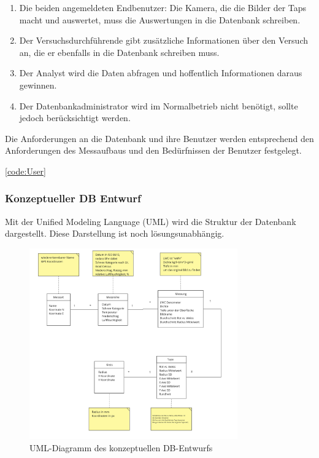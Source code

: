\begin{enumerate}
\item Die beiden angemeldeten Endbenutzer: Die Kamera, die die Bilder der Taps macht und auswertet, muss die Auswertungen in die Datenbank schreiben.
  \item Der Versuchsdurchführende gibt zusätzliche Informationen über den Versuch an, die er ebenfalls in die Datenbank schreiben muss.
    
    \item Der Analyst wird die Daten abfragen und hoffentlich Informationen daraus gewinnen.
    
    \item Der Datenbankadministrator wird im Normalbetrieb nicht benötigt, sollte jedoch berücksichtigt werden.
\end{enumerate}

Die Anforderungen an die Datenbank und ihre Benutzer werden entsprechend den Anforderungen des Messaufbaus und den Bedürfnissen der Benutzer festgelegt.

\ref{code:User}

\subsubsection{Konzeptueller DB Entwurf}

Mit der Unified Modeling Language (UML) wird die Struktur der Datenbank dargestellt. Diese Darstellung ist noch lösungsunabhängig.

\begin{figure}
    \centering
    \includegraphics[width=0.8\textwidth]{Bilder/Screenshotfrom2024-04-0113-01-07.png}
    \caption{UML-Diagramm des konzeptuellen DB-Entwurfs}
    \label{fig:uml-db-entwurf}
\end{figure}




